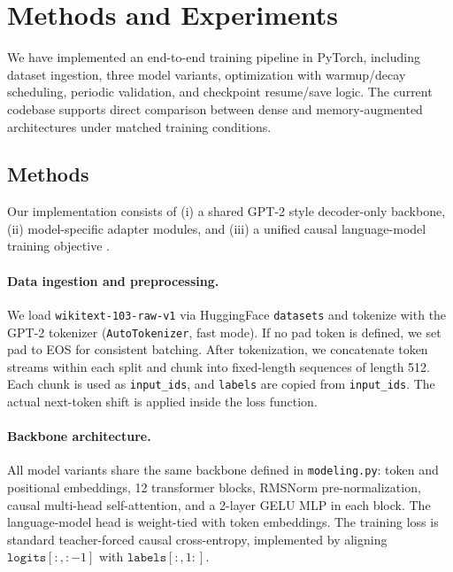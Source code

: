 \documentclass[11pt]{article}
\begin{document}
\section{Methods and Experiments}
We have implemented an end-to-end training pipeline in PyTorch, including dataset ingestion, three model variants, optimization with warmup/decay scheduling, periodic validation, and checkpoint resume/save logic.
The current codebase supports direct comparison between dense and memory-augmented architectures under matched training conditions.

\subsection{Methods}
Our implementation consists of (i) a shared GPT-2 style decoder-only backbone, (ii) model-specific adapter modules, and (iii) a unified causal language-model training objective \cite{radford2019language}.

\paragraph{Data ingestion and preprocessing.}
We load \texttt{wikitext-103-raw-v1} via HuggingFace \texttt{datasets} and tokenize with the GPT-2 tokenizer (\texttt{AutoTokenizer}, fast mode).
If no pad token is defined, we set pad to EOS for consistent batching.
After tokenization, we concatenate token streams within each split and chunk into fixed-length sequences of length 512.
Each chunk is used as \texttt{input\_ids}, and \texttt{labels} are copied from \texttt{input\_ids}.
The actual next-token shift is applied inside the loss function.

\paragraph{Backbone architecture.}
All model variants share the same backbone defined in \texttt{modeling.py}:
token and positional embeddings, 12 transformer blocks, RMSNorm pre-normalization, causal multi-head self-attention, and a 2-layer GELU MLP in each block.
The language-model head is weight-tied with token embeddings.
The training loss is standard teacher-forced causal cross-entropy, implemented by aligning $\texttt{logits}[:, :-1]$ with $\texttt{labels}[:, 1:]$.
\end{document}

